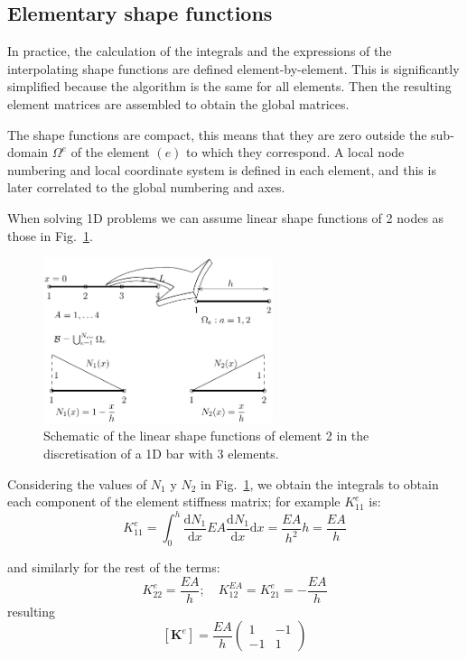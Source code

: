 \documentclass[spanish,a4paper,12pt]{article}
\begin{document}
\subsection{Elementary shape functions}
\label{sec:N_e}

In practice, the calculation of the integrals and the expressions of the interpolating shape functions are defined element-by-element. This is significantly simplified because the algorithm is the same for all elements. Then the resulting element matrices are assembled to obtain the global matrices.

The shape functions are compact, this means that they are zero outside the sub-domain $\Omega^{e}$ of the element $(e)$ to which they correspond. A local node numbering and local coordinate system is defined in each element, and this is later correlated to the global numbering and axes.

When solving 1D problems we can assume linear shape functions of 2 nodes as those in Fig.~\ref{fig:funciones_forma}. 

\begin{figure}[!htp]
\centering
% 
\includegraphics[width=0.6\textwidth]{figuras/func_forma1.pdf}
\caption{Schematic of the linear shape functions of element 2 in the discretisation of a 1D bar with 3 elements.}
\label{fig:funciones_forma}
\end{figure}

Considering the values of $N_1$ y $N_2$ in Fig.~\ref{fig:funciones_forma}, we obtain the integrals to obtain each component of the element stiffness matrix; for example $K_{11}^{e}$ is:
\begin{equation}\label{eq:N9}
K_{11}^{e}=\int_{0}^{h} \frac{\mathrm{d} N_{1}}{\mathrm{d} x} EA \frac{\mathrm{d} N_{1}}{\mathrm{d} x} \mathrm{d} x=\frac{EA}{h^{2}} h=\frac{EA}{h}
\end{equation}

and similarly for the rest of the terms:
\begin{equation}\label{eq:N10}
K_{22}^{e}=\frac{EA}{h} ; \quad K_{12}^{EA}=K_{21}^{e}=-\frac{EA}{h}
\end{equation}
resulting
\begin{equation}\label{eq:N11}
\left[\mathbf{K}^{e}\right]=\frac{EA}{h}\left(\begin{array}{cc}{1} & {-1} \\ {-1} & {1}\end{array}\right)
\end{equation}
\end{document}
